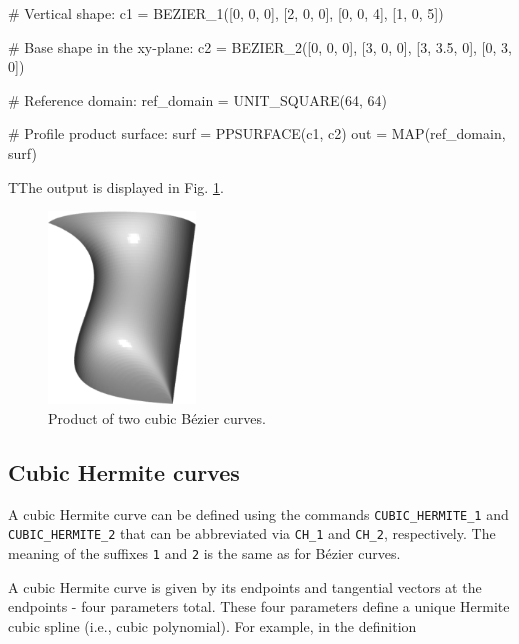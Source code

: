 \begin{bluecode}
# Vertical shape:
c1 = BEZIER_1([0, 0, 0], [2, 0, 0], [0, 0, 4], [1, 0, 5])

# Base shape in the xy-plane:
c2 = BEZIER_2([0, 0, 0], [3, 0, 0], [3, 3.5, 0], [0, 3, 0])

# Reference domain:
ref_domain = UNIT_SQUARE(64, 64)

# Profile product surface: 
surf = PPSURFACE(c1, c2)
out = MAP(ref_domain, surf)
\end{bluecode}
TThe output is displayed in Fig. \ref{fig:curves-13}.\\

\begin{figure}[!ht]
\begin{center}
\includegraphics[width=0.35\textwidth]{img/curves-13.png}
\end{center}
\vspace{-4mm}
\caption{Product of two cubic B\'ezier curves.}
\label{fig:curves-13}
\end{figure}

\subsection{Cubic Hermite curves}

A cubic Hermite curve can be defined using the commands 
{\tt CUBIC\_HERMITE\_1} and {\tt CUBIC\_HERMITE\_2} that 
can be abbreviated via {\tt CH\_1} and {\tt CH\_2}, respectively.
The meaning of the suffixes {\tt 1} and {\tt 2} is the same as 
for B\'ezier curves. 

A cubic Hermite curve is given by its 
endpoints and tangential vectors at the 
endpoints - four parameters total. These four parameters 
define a unique Hermite cubic spline (i.e., cubic polynomial). 
For example, in the definition

